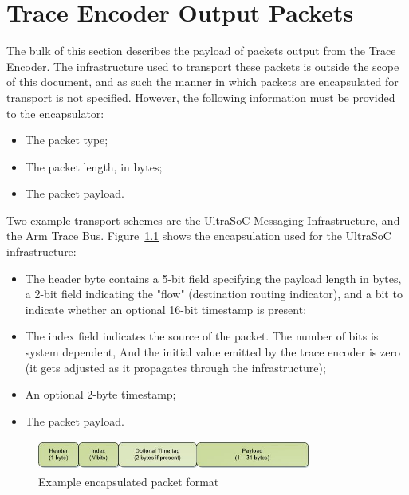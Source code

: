 \chapter{Trace Encoder Output Packets} \label{packets}

The bulk of this section describes the payload of packets output from the Trace Encoder.  
The infrastructure used to transport these packets is outside the scope of this document, and
as such the manner in which packets are encapsulated for transport is not specified.
However, the following information must be provided to the encapsulator:

\begin{itemize}
  \item The packet type;
  \item The packet length, in bytes;
  \item The packet payload.
\end{itemize}

Two example transport schemes are the UltraSoC Messaging Infrastructure, and the Arm Trace Bus.
Figure~\ref{fig:packet-format} shows the encapsulation used for the UltraSoC infrastructure:
\begin{itemize}
  \item The header byte contains a 5-bit field specifying the payload length in bytes, a 2-bit
    field indicating the "flow" (destination routing indicator), and a bit to indicate whether
    an optional 16-bit timestamp is present;
  \item The index field indicates the source of the packet.  The number of bits is system dependent,
    And the initial value emitted by the trace encoder is zero (it gets adjusted as it propagates 
    through the infrastructure);
  \item An optional 2-byte timestamp;
  \item The packet payload.
\end{itemize}

\begin{figure}[h]
  \begin{center}
    \includegraphics[height=1cm, width=9cm]{newPacket.jpg}
    \caption{Example encapsulated packet format}
    \label{fig:packet-format}
  \end{center}
\end{figure}



